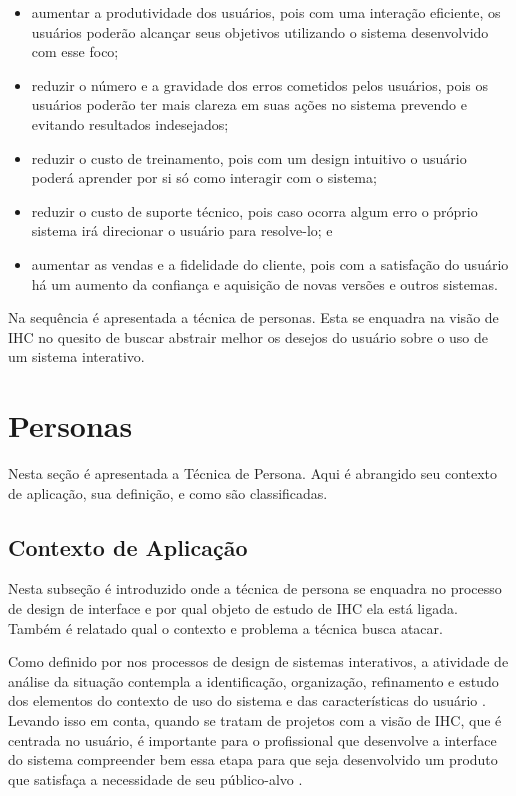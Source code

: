 \begin{itemize}
    \item aumentar a produtividade dos usuários, pois com uma interação eficiente, os usuários poderão alcançar seus objetivos utilizando o sistema desenvolvido com esse foco;

    \item reduzir o número e a gravidade dos erros cometidos pelos usuários, pois os usuários poderão ter mais clareza em suas ações no sistema prevendo e evitando resultados indesejados;

    \item reduzir o custo de treinamento, pois com um design intuitivo o usuário poderá aprender por si só como interagir com o sistema;

    \item reduzir o custo de suporte técnico, pois caso ocorra algum erro o próprio sistema irá direcionar o usuário para resolve-lo; e

    \item aumentar as vendas e a fidelidade do cliente, pois com a satisfação do usuário há um aumento da confiança e aquisição de novas versões e outros sistemas.
\end{itemize}

Na sequência é apresentada a técnica de personas. Esta se enquadra na visão de IHC no quesito de buscar abstrair melhor os desejos do usuário sobre o uso de um sistema interativo. 

\section{Personas}

Nesta seção é apresentada a Técnica de Persona. Aqui é abrangido seu contexto de aplicação, sua definição, e como são classificadas.

\subsection{Contexto de Aplicação}

Nesta subseção é introduzido onde a técnica de persona se enquadra no processo de design de interface e por qual objeto de estudo de IHC ela está ligada. Também é relatado qual o contexto e problema a técnica busca atacar.

Como definido por  nos processos de design de sistemas interativos, a atividade de análise da situação contempla a identificação, organização, refinamento e estudo dos elementos do contexto de uso do sistema e das características do usuário \cite{hewett1992}. Levando isso em conta, quando se tratam de projetos com a visão de IHC, que é centrada no usuário, é importante para o profissional que desenvolve a interface do sistema compreender bem essa etapa para que seja desenvolvido um produto que satisfaça a necessidade de seu público-alvo \cite{barbosa_silva}. %

